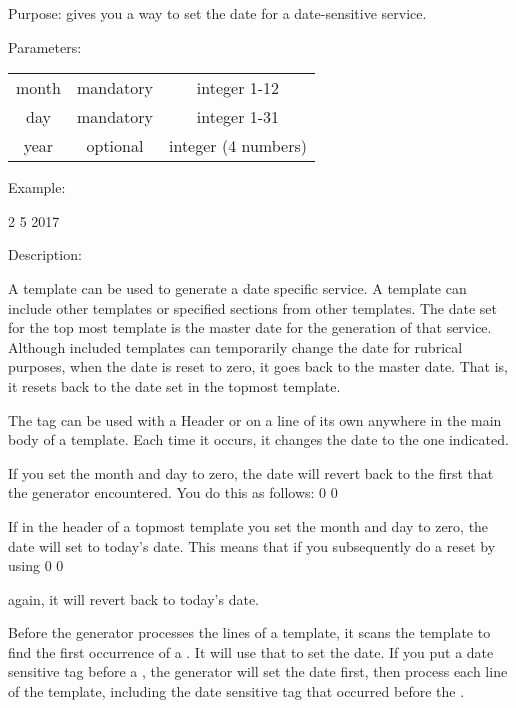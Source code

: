 \documentclass[]{memoir}
\begin{document}
Purpose: gives you a way to set the date for a date-sensitive service.

Parameters:

\begin{tabular}{c|c|c}
    month & mandatory & integer 1-12\\
    day & mandatory & integer 1-31 \\
    year & optional & integer (4 numbers) 
\end{tabular}

Example: 

\begin{atem}
 2
 5
 2017
\end{atem}

Description: 

A template can be used to generate a date specific service.  A template can include other templates or specified sections from other templates.  The date set for the top most template is the master date for the generation of that service.  Although included templates can temporarily change the date for rubrical purposes, when the date is reset to zero, it goes back to the master date.  That is, it resets back to the date set in the topmost template.

\begin{boxed}
The tag  can be used with a Header or on a line of its own anywhere in the main body of a template. Each time it occurs, it changes the date to the one indicated.
\end{boxed}

\begin{boxed}
If you set the month and day to zero, the date will revert back to the first  that the generator encountered. You do this as follows: 
 0
 0

\end{boxed}

\begin{boxed}
If in the header of a topmost template you set the month and day to zero, the date will set to today's date.  This means that if you subsequently do a reset by using  
 0
 0
\end{boxed}
 again, it will revert back to today's date.

\begin{warning}
Before the generator processes the lines of a template, it scans the template to find the first occurrence of a .  It will use that to set the date.  If you put a date sensitive tag before a , the generator will set the date first, then process each line of the template, including the date sensitive tag that occurred before the .
\end{warning}
\end{document}
